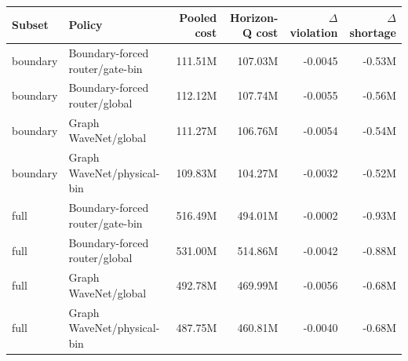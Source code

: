 \begin{tabular}{llrrrr}
\toprule
Subset & Policy & Pooled cost & Horizon-Q cost & $\Delta$ violation & $\Delta$ shortage \\
\midrule
boundary & Boundary-forced router/gate-bin & 111.51M & 107.03M & -0.0045 & -0.53M \\
boundary & Boundary-forced router/global & 112.12M & 107.74M & -0.0055 & -0.56M \\
boundary & Graph WaveNet/global & 111.27M & 106.76M & -0.0054 & -0.54M \\
boundary & Graph WaveNet/physical-bin & 109.83M & 104.27M & -0.0032 & -0.52M \\
full & Boundary-forced router/gate-bin & 516.49M & 494.01M & -0.0002 & -0.93M \\
full & Boundary-forced router/global & 531.00M & 514.86M & -0.0042 & -0.88M \\
full & Graph WaveNet/global & 492.78M & 469.99M & -0.0056 & -0.68M \\
full & Graph WaveNet/physical-bin & 487.75M & 460.81M & -0.0040 & -0.68M \\
\bottomrule
\end{tabular}
